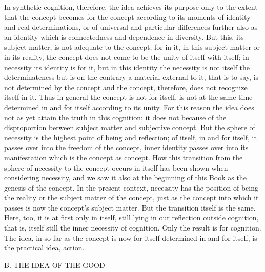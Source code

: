 In synthetic cognition, therefore,
the idea achieves its purpose only to the extent
that the concept becomes for the concept according to
its moments of identity and real determinations,
or of universal and particular differences
further also as an identity
which is connectedness and dependence in diversity.
But this, its subject matter, is not adequate to the concept;
for in it, in this subject matter or in its reality,
the concept does not come to be the unity
of itself with itself;
in necessity its identity is for it,
but in this identity the necessity is
not itself the determinateness
but is on the contrary a material
external to it, that is to say,
is not determined by the concept
and the concept, therefore,
does not recognize itself in it.
Thus in general the concept is not for itself,
is not at the same time determined in and for itself
according to its unity.
For this reason the idea does not as yet attain
the truth in this cognition:
it does not because of the disproportion
between subject matter and subjective concept.
But the sphere of necessity is
the highest point of being and reflection;
of itself, in and for itself, it passes
over into the freedom of the concept,
inner identity passes over into its manifestation
which is the concept as concept.
How this transition from the sphere of necessity
to the concept occurs in itself has been shown
when considering necessity,
and we saw it also at the beginning of this Book as
the genesis of the concept.
In the present context, necessity has the position of
being the reality or the subject matter of the concept,
just as the concept into which it passes is
now the concept's subject matter.
But the transition itself is the same.
Here, too, it is at first only in itself,
still lying in our reflection outside cognition,
that is, itself still the inner necessity of cognition.
Only the result is for cognition.
The idea, in so far as the concept is now
for itself determined in and for itself,
is the practical idea, action.

B. THE IDEA OF THE GOOD


